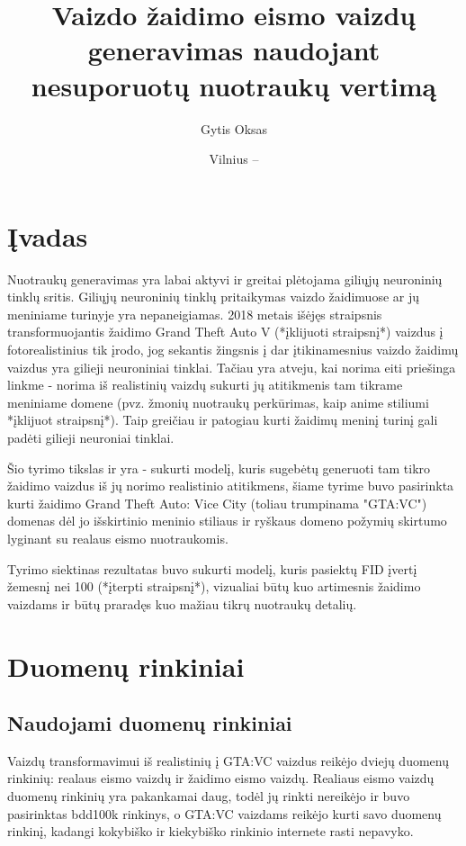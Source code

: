 \documentclass{VUMIFPSkursinis}
\institute{Informatikos institutas}  %
\title{Vaizdo žaidimo eismo vaizdų generavimas naudojant nesuporuotų nuotraukų vertimą}
\author{Gytis Oksas}
\date{Vilnius – \the\year}
\begin{document}
\maketitle

\tableofcontents

\section{Įvadas}
Nuotraukų generavimas yra labai aktyvi ir greitai plėtojama giliųjų neuroninių tinklų sritis. Giliųjų neuroninių tinklų pritaikymas vaizdo žaidimuose ar jų meniniame turinyje yra nepaneigiamas. 2018 metais išėjęs straipsnis transformuojantis žaidimo Grand Theft Auto V (*įklijuoti straipsnį*) vaizdus į fotorealistinius tik įrodo, jog sekantis žingsnis į dar įtikinamesnius vaizdo žaidimų vaizdus yra gilieji neuroniniai tinklai. Tačiau yra atveju, kai norima eiti priešinga linkme - norima iš realistinių vaizdų sukurti jų atitikmenis tam tikrame meniniame domene (pvz. žmonių nuotraukų perkūrimas, kaip anime stiliumi *įklijuot straipsnį*). Taip greičiau ir patogiau kurti žaidimų meninį turinį gali padėti gilieji neuroniai tinklai. 

Šio tyrimo tikslas ir yra - sukurti modelį, kuris sugebėtų generuoti tam tikro žaidimo vaizdus iš jų norimo realistinio atitikmens, šiame tyrime buvo pasirinkta kurti žaidimo Grand Theft Auto: Vice City (toliau trumpinama "GTA:VC") domenas dėl jo išskirtinio meninio stiliaus ir ryškaus domeno požymių skirtumo lyginant su realaus eismo nuotraukomis.

Tyrimo siektinas rezultatas buvo sukurti modelį, kuris pasiektų FID įvertį žemesnį nei 100 (*įterpti straipsnį*), vizualiai būtų kuo artimesnis žaidimo vaizdams ir būtų praradęs kuo mažiau tikrų nuotraukų detalių.

\section{Duomenų rinkiniai}
\subsection{Naudojami duomenų rinkiniai}
Vaizdų transformavimui iš realistinių į GTA:VC vaizdus reikėjo dviejų duomenų rinkinių: realaus eismo vaizdų ir žaidimo eismo vaizdų. Realiaus eismo vaizdų duomenų rinkinių yra pakankamai daug, todėl jų rinkti nereikėjo ir buvo pasirinktas bdd100k rinkinys, o GTA:VC vaizdams reikėjo kurti savo duomenų rinkinį, kadangi kokybiško ir kiekybiško rinkinio internete rasti nepavyko. 
\end{document}

